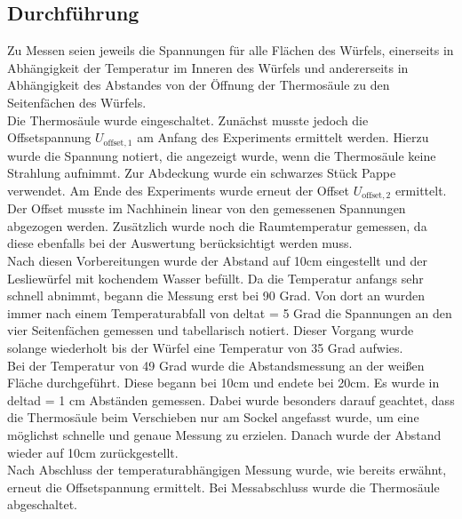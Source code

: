 \subsection{Durchführung}
Zu Messen seien jeweils die Spannungen für alle Flächen des Würfels, einerseits in Abhängigkeit der Temperatur im Inneren des Würfels und andererseits in Abhängigkeit des Abstandes von der Öffnung der Thermosäule zu den Seitenfächen des Würfels. \\
Die Thermosäule wurde eingeschaltet.
Zunächst musste jedoch die Offsetspannung $U_{\text{offset},1}$ am Anfang des Experiments ermittelt werden.
Hierzu wurde die Spannung notiert, die angezeigt wurde, wenn die Thermosäule keine Strahlung aufnimmt.
Zur Abdeckung wurde ein schwarzes Stück Pappe verwendet.
Am Ende des Experiments wurde erneut der Offset $U_{\text{offset},2}$ ermittelt.
Der Offset musste im Nachhinein linear von den gemessenen Spannungen abgezogen werden.
Zusätzlich wurde noch die Raumtemperatur gemessen, da diese ebenfalls bei der Auswertung berücksichtigt werden muss. \\
Nach diesen Vorbereitungen wurde der Abstand auf 10cm eingestellt und der Lesliewürfel mit kochendem Wasser befüllt.
Da die Temperatur anfangs sehr schnell abnimmt, begann die Messung erst bei 90 Grad.
Von dort an wurden immer nach einem Temperaturabfall von deltat = 5 Grad die Spannungen an den vier Seitenfächen gemessen und tabellarisch notiert.
Dieser Vorgang wurde solange wiederholt bis der Würfel eine Temperatur von 35 Grad aufwies. \\
Bei der Temperatur von 49 Grad wurde die Abstandsmessung an der weißen Fläche durchgeführt.
Diese begann bei 10cm und endete bei 20cm.
Es wurde in deltad = 1 cm Abständen gemessen.
Dabei wurde besonders darauf geachtet, dass die Thermosäule beim Verschieben nur am Sockel angefasst wurde, um eine möglichst schnelle und genaue Messung zu erzielen.
Danach wurde der Abstand wieder auf 10cm zurückgestellt.\\
Nach Abschluss der temperaturabhängigen Messung wurde, wie bereits erwähnt, erneut die Offsetspannung ermittelt.
Bei Messabschluss wurde die Thermosäule abgeschaltet.
